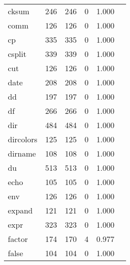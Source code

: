 \begin{longtable}{lp{2.20cm}p{2.20cm}p{2.20cm}p{2.20cm}p{2.20cm}}
cksum     &                     246 &              246 &                 0 &                        1.000 \\
comm      &                     126 &              126 &                 0 &                        1.000 \\
cp        &                     335 &              335 &                 0 &                        1.000 \\
csplit    &                     339 &              339 &                 0 &                        1.000 \\
cut       &                     126 &              126 &                 0 &                        1.000 \\
date      &                     208 &              208 &                 0 &                        1.000 \\
dd        &                     197 &              197 &                 0 &                        1.000 \\
df        &                     266 &              266 &                 0 &                        1.000 \\
dir       &                     484 &              484 &                 0 &                        1.000 \\
dircolors &                     125 &              125 &                 0 &                        1.000 \\
dirname   &                     108 &              108 &                 0 &                        1.000 \\
du        &                     513 &              513 &                 0 &                        1.000 \\
echo      &                     105 &              105 &                 0 &                        1.000 \\
env       &                     126 &              126 &                 0 &                        1.000 \\
expand    &                     121 &              121 &                 0 &                        1.000 \\
expr      &                     323 &              323 &                 0 &                        1.000 \\
factor    &                     174 &              170 &                 4 &                        0.977 \\
false     &                     104 &              104 &                 0 &                        1.000 \\

\end{longtable}
